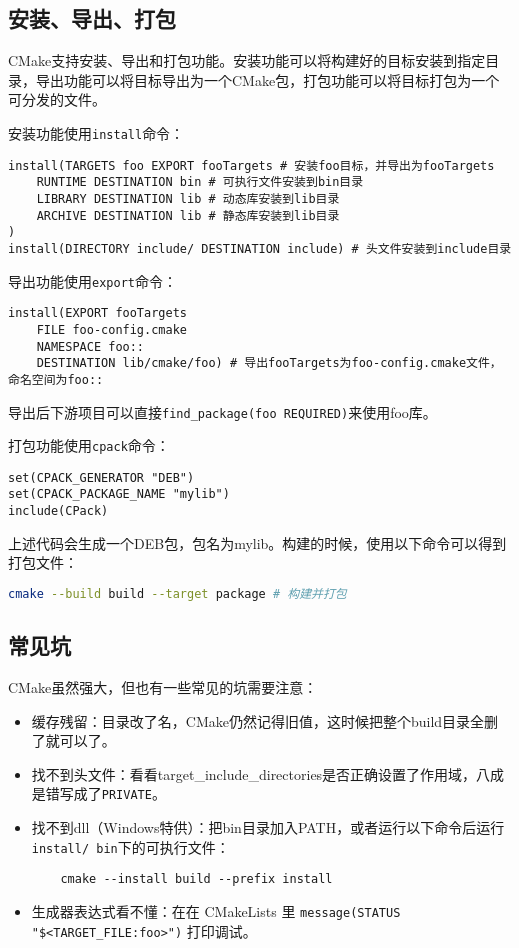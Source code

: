 \documentclass[../main.tex]{subfiles}
\begin{document}
\subsection{安装、导出、打包}

CMake支持安装、导出和打包功能。安装功能可以将构建好的目标安装到指定目录，导出功能可以将目标导出为一个CMake包，打包功能可以将目标打包为一个可分发的文件。

安装功能使用\texttt{install}命令：
\begin{lstlisting}
install(TARGETS foo EXPORT fooTargets # 安装foo目标，并导出为fooTargets
    RUNTIME DESTINATION bin # 可执行文件安装到bin目录
    LIBRARY DESTINATION lib # 动态库安装到lib目录
    ARCHIVE DESTINATION lib # 静态库安装到lib目录
)
install(DIRECTORY include/ DESTINATION include) # 头文件安装到include目录
\end{lstlisting}

导出功能使用\texttt{export}命令：
\begin{lstlisting}
install(EXPORT fooTargets
    FILE foo-config.cmake
    NAMESPACE foo::
    DESTINATION lib/cmake/foo) # 导出fooTargets为foo-config.cmake文件，命名空间为foo::
\end{lstlisting}
导出后下游项目可以直接\texttt{find\_package(foo REQUIRED)}来使用foo库。

打包功能使用\texttt{cpack}命令：
\begin{lstlisting}
set(CPACK_GENERATOR "DEB")
set(CPACK_PACKAGE_NAME "mylib")
include(CPack)
\end{lstlisting}
上述代码会生成一个DEB包，包名为mylib。构建的时候，使用以下命令可以得到打包文件：
\begin{lstlisting}[language=bash]
cmake --build build --target package # 构建并打包
\end{lstlisting}

\subsection{常见坑}
CMake虽然强大，但也有一些常见的坑需要注意：
\begin{itemize}
  \item 缓存残留：目录改了名，CMake仍然记得旧值，这时候把整个build目录全删了就可以了。
  \item 找不到头文件：看看target\_include\_directories是否正确设置了作用域，八成是错写成了\texttt{PRIVATE}。
  \item 找不到dll（Windows特供）：把bin目录加入PATH，或者运行以下命令后运行\texttt{install/ bin}下的可执行文件：
\begin{lstlisting}
    cmake --install build --prefix install
\end{lstlisting}
  \item 生成器表达式看不懂：在在 CMakeLists 里 \texttt{message(STATUS "\$<TARGET\_FILE:foo>")} 打印调试。
\end{itemize}
\end{document}
